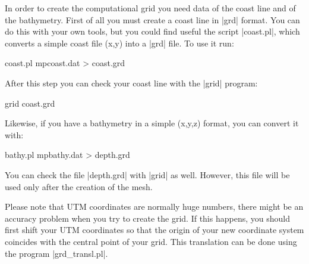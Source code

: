 
%
%
%
%
%
%
%

In order to create the computational grid you need data of the coast line
and of the bathymetry.
First of all you must create a coast line in |grd| format. You can do
this with your own tools, but you could find useful the script
|coast.pl|, which converts a simple coast file (x,y) into a |grd| file.
To use it run:

\begin{code}
    coast.pl mpcoast.dat > coast.grd
\end{code}

After this step you can check your coast line with the |grid| program:

\begin{code}
    grid coast.grd
\end{code}

Likewise, if you have a bathymetry in a simple (x,y,z) format, you can
convert it with:

\begin{code}
    bathy.pl mpbathy.dat > depth.grd
\end{code}

You can check the file |depth.grd| with |grid| as well. However, this file 
will be used only after the creation of the mesh.

Please note that UTM coordinates are normally huge numbers, there
might be an accuracy problem when you try to create the grid. If this
happens, you should first shift your UTM coordinates so that the origin
of your new coordinate system coincides with the central point of your
grid. This translation can be done using the program |grd_transl.pl|.

